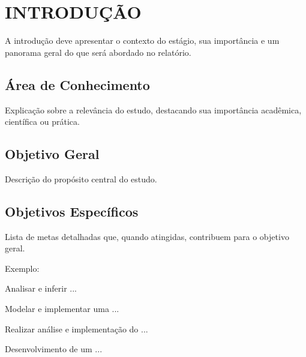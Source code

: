 \section{INTRODUÇÃO}

A introdução deve apresentar o contexto do estágio, sua importância e um panorama geral do que será abordado no relatório.


\subsection{Área de Conhecimento} \label{sec:areaconhecimento}
Explicação sobre a relevância do estudo, destacando sua importância acadêmica, científica ou prática.


\subsection{Objetivo Geral} \label{sec:objetivo-geral}

Descrição do propósito central do estudo.


\subsection{Objetivos Específicos} \label{sec:objetivos-especificos}
Lista de metas detalhadas que, quando atingidas, contribuem para o objetivo geral. 


Exemplo:
\begin{alineas} %
    \item Analisar e inferir ...
    
    \item Modelar e implementar uma ...
    
    \item Realizar análise e implementação do ...
    
    \item Desenvolvimento de um ...
\end{alineas}


